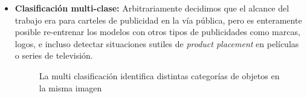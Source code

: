 \documentclass[a4paper]{article}
\begin{document}
\begin{itemize}
\begin{figure}[H]
\end{figure}

\item \textbf{Clasificación multi-clase:} Arbitrariamente decidimos que el alcance del trabajo era para carteles de publicidad en la vía pública, pero es enteramente posible re-entrenar los modelos con otros tipos de publicidades como marcas, logos, e incluso detectar situaciones sutiles de \textit{product placement} en películas o series de televisión.

\begin{figure}[H]
\caption{La multi clasificación identifica distintas categorías de objetos en la misma imagen}
\end{figure}

\end{itemize}
\end{document}
